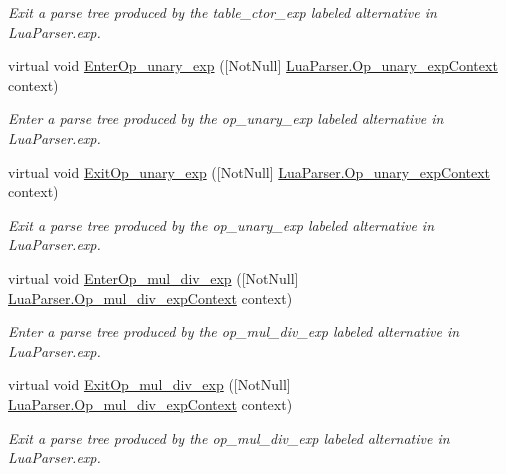 \begin{DoxyCompactItemize}
\begin{DoxyCompactList}\small\item\em Exit a parse tree produced by the {\ttfamily table\+\_\+ctor\+\_\+exp} labeled alternative in Lua\+Parser.\+exp. \end{DoxyCompactList}\item 
virtual void \mbox{\hyperlink{classzlua_1_1_lua_base_listener_ad4db24437ff42fb074c69313ec11818d}{Enter\+Op\+\_\+unary\+\_\+exp}} (\mbox{[}Not\+Null\mbox{]} \mbox{\hyperlink{classzlua_1_1_lua_parser_1_1_op__unary__exp_context}{Lua\+Parser.\+Op\+\_\+unary\+\_\+exp\+Context}} context)
\begin{DoxyCompactList}\small\item\em Enter a parse tree produced by the {\ttfamily op\+\_\+unary\+\_\+exp} labeled alternative in Lua\+Parser.\+exp. \end{DoxyCompactList}\item 
virtual void \mbox{\hyperlink{classzlua_1_1_lua_base_listener_abf62739a5cda90c32f65e7a81c3e72a2}{Exit\+Op\+\_\+unary\+\_\+exp}} (\mbox{[}Not\+Null\mbox{]} \mbox{\hyperlink{classzlua_1_1_lua_parser_1_1_op__unary__exp_context}{Lua\+Parser.\+Op\+\_\+unary\+\_\+exp\+Context}} context)
\begin{DoxyCompactList}\small\item\em Exit a parse tree produced by the {\ttfamily op\+\_\+unary\+\_\+exp} labeled alternative in Lua\+Parser.\+exp. \end{DoxyCompactList}\item 
virtual void \mbox{\hyperlink{classzlua_1_1_lua_base_listener_a6c6043921201d7aad886fc07f059c3e8}{Enter\+Op\+\_\+mul\+\_\+div\+\_\+exp}} (\mbox{[}Not\+Null\mbox{]} \mbox{\hyperlink{classzlua_1_1_lua_parser_1_1_op__mul__div__exp_context}{Lua\+Parser.\+Op\+\_\+mul\+\_\+div\+\_\+exp\+Context}} context)
\begin{DoxyCompactList}\small\item\em Enter a parse tree produced by the {\ttfamily op\+\_\+mul\+\_\+div\+\_\+exp} labeled alternative in Lua\+Parser.\+exp. \end{DoxyCompactList}\item 
virtual void \mbox{\hyperlink{classzlua_1_1_lua_base_listener_ab89797d488c6f1700d00a8a609baf9f5}{Exit\+Op\+\_\+mul\+\_\+div\+\_\+exp}} (\mbox{[}Not\+Null\mbox{]} \mbox{\hyperlink{classzlua_1_1_lua_parser_1_1_op__mul__div__exp_context}{Lua\+Parser.\+Op\+\_\+mul\+\_\+div\+\_\+exp\+Context}} context)
\begin{DoxyCompactList}\small\item\em Exit a parse tree produced by the {\ttfamily op\+\_\+mul\+\_\+div\+\_\+exp} labeled alternative in Lua\+Parser.\+exp. \end{DoxyCompactList}\item 

\end{DoxyCompactItemize}
